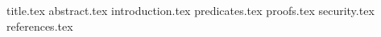\documentclass[11pt]{llncs}
\begin{document}
{title.tex}
\thispagestyle{plain}
{abstract.tex}
{introduction.tex}
{predicates.tex}
{proofs.tex}
{security.tex}
{references.tex}
\end{document}
